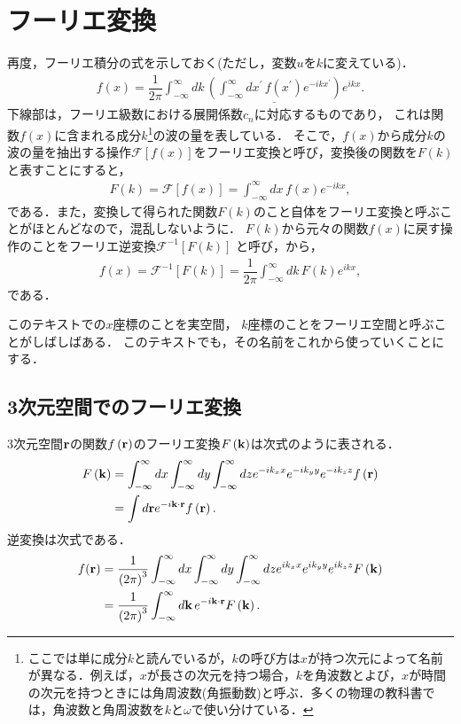 \section{フーリエ変換}
%
再度，フーリエ積分の式を示しておく(ただし，変数$u$を$k$に変えている)．
\begin{align}
 f\left(x\right) = \dfrac{1}{2\pi}\int_{-\infty}^{\infty}dk\,
                    \underline{\left(\int_{-\infty}^{\infty}dx^{\prime}\,f\left(x^{\prime}\right)e^{-ikx^{\prime}}\right)}e^{ikx}. \label{fourier_integral_02}
\end{align}
下線部は，フーリエ級数における展開係数$c_n$に対応するものであり，
これは関数$f(x)$に含まれる成分$k$\footnote{ここでは単に成分$k$と読んでいるが，$k$の呼び方は$x$が持つ次元によって名前が異なる．例えば，$x$が長さの次元を持つ場合，$k$を角波数とよび，$x$が時間の次元を持つときには角周波数(角振動数)と呼ぶ．多くの物理の教科書では，角波数と角周波数を$k$と$\omega$で使い分けている．}の波の量を表している．
そこで，$f(x)$から成分$k$の波の量を抽出する操作$\mathcal{F}[f(x)]$をフーリエ変換と呼び，変換後の関数を$F(k)$と表すことにすると，
\begin{align}
 F\left(k\right) = \mathcal{F}\left[f\left(x\right)\right] = \int_{-\infty}^{\infty}dx\, f\left(x\right)e^{-ikx},
\end{align}
である．また，変換して得られた関数$F\left(k\right)$のこと自体をフーリエ変換と呼ぶことがほとんどなので，混乱しないように．
$F\left(k\right)$から元々の関数$f\left(x\right)$に戻す操作のことをフーリエ逆変換$\mathcal{F}^{-1}\left[F(k)\right]$
と呼び，から，
\begin{align}
 f\left(x\right) = \mathcal{F}^{-1}\left[F\left(k\right)\right]
 = \dfrac{1}{2\pi} \int_{-\infty}^{\infty}dk\, F\left(k\right)e^{ikx},
\end{align}
である．

このテキストでの$x$座標のことを実空間，
$k$座標のことをフーリエ空間と呼ぶことがしばしばある．
このテキストでも，その名前をこれから使っていくことにする．
%
\subsection{3次元空間でのフーリエ変換}
%
3次元空間${\bf r}$の関数$f\left({\bf r}\right)$のフーリエ変換$F\left({\bf k}\right)$は次式のように表される．
\begin{align}
 F\left({\bf k}\right) &= \int_{-\infty}^{\infty}dx\int_{-\infty}^{\infty}dy \int_{-\infty}^{\infty}dz
                         e^{-ik_x x}e^{-ik_y y}e^{-ik_z z} f\left({\bf r}\right) \notag \\
                       &= \int d{\bf r}e^{-i{\bf k}\cdot {\bf r}}f\left({\bf r}\right).
\end{align}
%
逆変換は次式である．
\begin{align}
 f({\bf r}) &= \dfrac{1}{\left(2\pi\right)^3} \int_{-\infty}^{\infty}dx\int_{-\infty}^{\infty}dy \int_{-\infty}^{\infty}dz
              e^{ik_x x}e^{ik_y y}e^{ik_z z} F\left({\bf k}\right) \notag \\
            &=  \dfrac{1}{\left(2\pi\right)^3} \int_{-\infty}^{\infty}d{\bf k}\,e^{-i{\bf k}\cdot {\bf r}} F\left({\bf k}\right).
\end{align}
%
